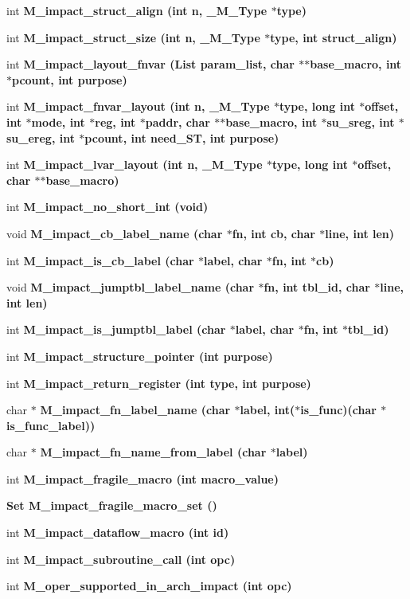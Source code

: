 \begin{CompactItemize}
int \bf{M\_\-impact\_\-struct\_\-align} (int n, \bf{\_\-M\_\-Type} $\ast$type)
\item 
int \bf{M\_\-impact\_\-struct\_\-size} (int n, \bf{\_\-M\_\-Type} $\ast$type, int struct\_\-align)
\item 
int \bf{M\_\-impact\_\-layout\_\-fnvar} (\bf{List} param\_\-list, char $\ast$$\ast$base\_\-macro, int $\ast$pcount, int purpose)
\item 
int \bf{M\_\-impact\_\-fnvar\_\-layout} (int n, \bf{\_\-M\_\-Type} $\ast$type, long int $\ast$offset, int $\ast$\bf{mode}, int $\ast$reg, int $\ast$paddr, char $\ast$$\ast$base\_\-macro, int $\ast$su\_\-sreg, int $\ast$su\_\-ereg, int $\ast$pcount, int need\_\-ST, int purpose)
\item 
int \bf{M\_\-impact\_\-lvar\_\-layout} (int n, \bf{\_\-M\_\-Type} $\ast$type, long int $\ast$offset, char $\ast$$\ast$base\_\-macro)
\item 
int \bf{M\_\-impact\_\-no\_\-short\_\-int} (void)
\item 
void \bf{M\_\-impact\_\-cb\_\-label\_\-name} (char $\ast$fn, int cb, char $\ast$line, int len)
\item 
int \bf{M\_\-impact\_\-is\_\-cb\_\-label} (char $\ast$label, char $\ast$fn, int $\ast$cb)
\item 
void \bf{M\_\-impact\_\-jumptbl\_\-label\_\-name} (char $\ast$fn, int tbl\_\-id, char $\ast$line, int len)
\item 
int \bf{M\_\-impact\_\-is\_\-jumptbl\_\-label} (char $\ast$label, char $\ast$fn, int $\ast$tbl\_\-id)
\item 
int \bf{M\_\-impact\_\-structure\_\-pointer} (int purpose)
\item 
int \bf{M\_\-impact\_\-return\_\-register} (int type, int purpose)
\item 
char $\ast$ \bf{M\_\-impact\_\-fn\_\-label\_\-name} (char $\ast$label, int($\ast$is\_\-func)(char $\ast$is\_\-func\_\-label))
\item 
char $\ast$ \bf{M\_\-impact\_\-fn\_\-name\_\-from\_\-label} (char $\ast$label)
\item 
int \bf{M\_\-impact\_\-fragile\_\-macro} (int macro\_\-value)
\item 
\bf{Set} \bf{M\_\-impact\_\-fragile\_\-macro\_\-set} ()
\item 
int \bf{M\_\-impact\_\-dataflow\_\-macro} (int id)
\item 
int \bf{M\_\-impact\_\-subroutine\_\-call} (int opc)
\item 
int \bf{M\_\-oper\_\-supported\_\-in\_\-arch\_\-impact} (int opc)
$$
\end{CompactItemize}
